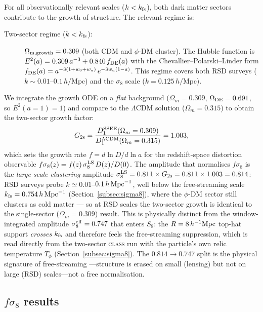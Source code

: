 \documentclass[12pt,a4paper]{article}
\newcommand{\phiDM}{\phi\text{-DM}}
\newcommand{\kfs}{k_{\rm fs}}
\newcommand{\fsig}{f\sigma_8}
\newcommand{\sigeff}{\sigma_8^{\rm eff}}
\newcommand{\sigls}{\sigma_8^{\rm LS}}
\begin{document}
For all observationally relevant scales ($k < \kfs$), both dark matter sectors
contribute to the growth of structure. The relevant regime is:

\begin{description}
  \item[Two-sector regime ($k < \kfs$):] $\Omega_{\rm m,growth} = 0.309$
    (both CDM and $\phiDM$ cluster). The Hubble function is
    $E^2(a) = 0.309\,a^{-3} + 0.840\,f_{\rm DE}(a)$
    with the Chevallier--Polarski--Linder \citep{ChevallierPolarski2001} form
    $f_{\rm DE}(a) = a^{-3(1+w_0+w_a)}\,e^{-3w_a(1-a)}$.
    This regime covers both RSD surveys ($k \sim 0.01$--$0.1\,h/\mathrm{Mpc}$)
    and the $\sigma_8$ scale ($k = 0.125\,h/\mathrm{Mpc}$).
\end{description}

We integrate the growth ODE on a \emph{flat} background ($\Omega_m = 0.309$,
$\Omega_{\rm DE} = 0.691$, so $E^2(a{=}1) = 1$) and compare to the
$\Lambda$CDM solution ($\Omega_m = 0.315$) to obtain the two-sector growth factor:
\begin{equation}
  G_{\rm 2s} = \frac{D_1^{\rm SSEE}(\Omega_m=0.309)}{D_1^{\Lambda{\rm CDM}}(\Omega_m=0.315)} = 1.003,
  \label{eq:G2s}
\end{equation}
which sets the growth rate $f = d\ln D/d\ln a$ for the redshift-space distortion
observable \citep{Percival2009} $\fsig(z) = f(z)\,\sigls\,D(z)/D(0)$.
The amplitude that normalises $\fsig$ is the \emph{large-scale clustering}
amplitude $\sigls = 0.811\times G_{\rm 2s} = 0.811\times1.003 = 0.814$: RSD
surveys probe $k\simeq 0.01$--$0.1\,h\,{\rm Mpc}^{-1}$, well below the
free-streaming scale $k_{\rm fs} = 0.754\,h\,{\rm Mpc}^{-1}$
(Section~\ref{subsec:sigma8}), where the $\phi$-DM sector still clusters as
cold matter --- so at RSD scales the two-sector growth is identical to the
single-sector ($\Omega_m = 0.309$) result. This is physically distinct from the
window-integrated amplitude $\sigeff = 0.747$ that enters $S_8$: the
$R = 8\,h^{-1}{\rm Mpc}$ top-hat support \emph{crosses} $k_{\rm fs}$ and
therefore feels the free-streaming suppression, which is read directly from the
two-sector \textsc{class} run with the particle's own relic temperature $T_\phi$
(Section~\ref{subsec:sigma8}). The $0.814\!\to\!0.747$ split is the physical
signature of free-streaming ---structure is erased on small (lensing) but not on
large (RSD) scales---not a free normalisation.

\subsection{$f\sigma_8$ results}
\label{subsec:fsig8}
\end{document}
